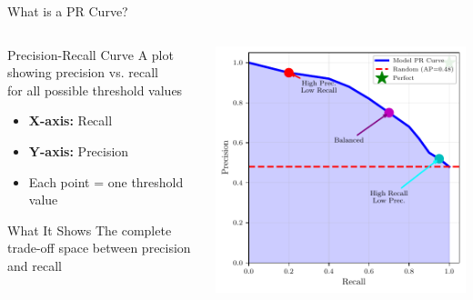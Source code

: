 \documentclass{beamer}
\begin{document}
\begin{frame}{What is a PR Curve?}
\begin{columns}
\begin{column}{0.48\textwidth}
\begin{definitionbox}{Precision-Recall Curve}
\small
A plot showing precision vs. recall \\
for all possible threshold values

\vspace{0.15cm}

\begin{itemize}
    \item \textbf{X-axis:} Recall
    \item \textbf{Y-axis:} Precision
    \item Each point = one threshold value
\end{itemize}
\end{definitionbox}

\vspace{0.15cm}

\begin{keypointsbox}{What It Shows}
\small
The complete trade-off space between precision and recall
\end{keypointsbox}
\end{column}
\begin{column}{0.48\textwidth}
\includegraphics[width=\textwidth]{pr-curve-diagram.pdf}
\end{column}
\end{columns}
\end{frame}
\end{document}
